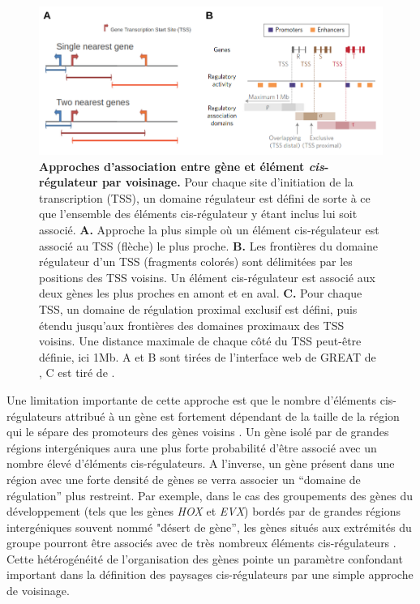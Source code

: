 \begin{figure}[h]
 \centering
 \includegraphics[width=1\textwidth, page=1]{figures/chap2/chap2-fig1.png}
 \caption[Approches d'association entre gène et élément \textit{cis}-régulateur par voisinage.]{
 \textbf{Approches d'association entre gène et élément \textit{cis}-régulateur par voisinage.}
 Pour chaque site d'initiation de la transcription (\acrshort{TSS}), un domaine régulateur est défini de sorte à ce que l'ensemble des éléments \gls{cis}-régulateur y étant inclus lui soit associé.
 \textbf{A.} Approche la plus simple où un élément \gls{cis}-régulateur est associé au \acrshort{TSS} (flèche) le plus proche. 
 \textbf{B.} Les frontières du domaine régulateur d'un \acrshort{TSS} (fragments colorés) sont délimitées par les positions des \acrshort{TSS} voisins. Un élément \gls{cis}-régulateur est associé aux deux gènes les plus proches en amont et en aval.
 \textbf{C.} Pour chaque \acrshort{TSS}, un domaine de régulation proximal exclusif est défini, puis étendu jusqu'aux frontières des domaines proximaux des \acrshort{TSS} voisins. Une distance maximale de chaque côté du \acrshort{TSS} peut-être définie, ici 1Mb. A et B sont tirées de l'interface web de GREAT de \citet{mclean_great_2010}, C est tiré de \citet{berthelot_complexity_2018}. \\
 }
 \label{fig:chap2-fig1}
\end{figure} 

Une limitation importante de cette approche est que le nombre d’éléments \gls{cis}-régulateurs attribué à un gène est fortement dépendant de la taille de la région qui le sépare des promoteurs des gènes voisins \citep{taher_variable_2009}. Un gène isolé par de grandes régions intergéniques aura une plus forte probabilité d’être associé avec un nombre élevé d’éléments \gls{cis}-régulateurs. A l’inverse, un gène présent dans une région avec une forte densité de gènes se verra associer un “domaine de régulation” plus restreint. Par exemple, dans le cas des groupements des gènes du développement (tels que les gènes \textit{HOX} et \textit{EVX}) bordés par de grandes régions intergéniques souvent nommé "désert de gène”, les gènes situés aux extrémités du groupe pourront être associés avec de très nombreux éléments \gls{cis}-régulateurs \citep{taher_variable_2009}. Cette hétérogénéité de l’organisation des gènes pointe un paramètre confondant important dans la définition des paysages \gls{cis}-régulateurs par une simple approche de voisinage.

